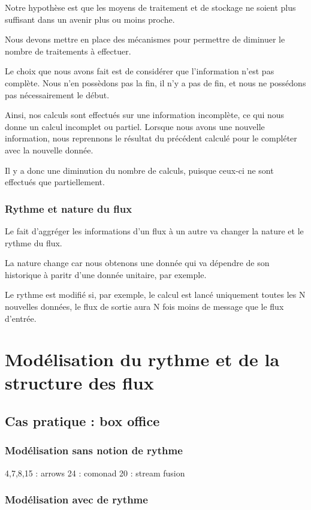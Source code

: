 \documentclass{llncs}
\begin{document}
Notre hypothèse est que les moyens de traitement et de stockage ne soient plus
suffisant dans un avenir plus ou moins proche.

Nous devons mettre en place des mécanismes pour permettre de diminuer le nombre
de traitements à effectuer.

Le choix que nous avons fait est de considérer que l'information n'est pas complète.
Nous n'en possèdons pas la fin, il n'y a pas de fin, et nous ne possédons pas
nécessairement le début.

Ainsi, nos calculs sont effectués sur une information incomplète, ce qui nous
donne un calcul incomplet ou partiel.
Lorsque nous avons une nouvelle information, nous reprennons le résultat du
précédent calculé pour le compléter avec la nouvelle donnée.

Il y a donc une diminution du nombre de calculs, puisque ceux-ci ne sont effectués
que partiellement.

\subsubsection{Rythme et nature du flux}
Le fait d'aggréger les informations d'un flux à un autre va changer la nature et
le rythme du flux.

La nature change car nous obtenons une donnée qui va dépendre de son historique
à paritr d'une donnée unitaire, par exemple.

Le rythme est modifié si, par exemple, le calcul est lancé uniquement toutes les
N nouvelles données, le flux de sortie aura N fois moins de message que le flux d'entrée.

\section{Modélisation du rythme et de la structure des flux}
\subsection{Cas pratique : box office}
\subsubsection{Modélisation sans notion de rythme}
4,7,8,15 : arrows
24 : comonad
20 : stream fusion

\subsubsection{Modélisation avec de rythme}
\end{document}
